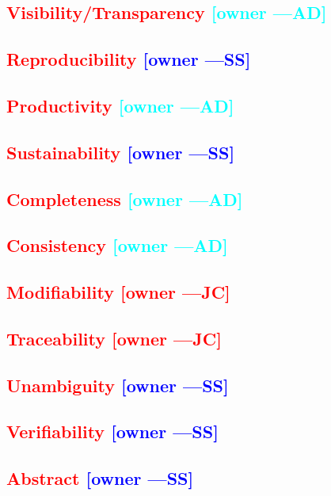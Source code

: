 \documentclass[letterpaper,cleveref]{lipics-v2019}
\newcommand{\authornote}[3]{\textcolor{#1}{[#3 ---#2]}}
\newcommand{\authornote}[3]{}
\newcommand{\wss}[1]{\authornote{blue}{SS}{#1}} %
\newcommand{\jc}[1]{\authornote{red}{JC}{#1}} %
\newcommand{\ad}[1]{\authornote{cyan}{AD}{#1}} %
\newcommand{\notdone}[1]{\textcolor{red}{#1}}
\theoremstyle{definition}
\begin{document}
\subsection{\notdone{Visibility/Transparency} \ad{owner}}

\subsection{\notdone{Reproducibility} \wss{owner}}

\subsection{\notdone{Productivity} \ad{owner}}

\subsection{\notdone{Sustainability} \wss{owner}}

\subsection{\notdone{Completeness} \ad{owner}}

\subsection{\notdone{Consistency} \ad{owner}}

\subsection{\notdone{Modifiability} \jc{owner}}

\subsection{\notdone{Traceability} \jc{owner}}

\subsection{\notdone{Unambiguity} \wss{owner}}

\subsection{\notdone{Verifiability} \wss{owner}}

\subsection{\notdone{Abstract} \wss{owner}}
\end{document}
